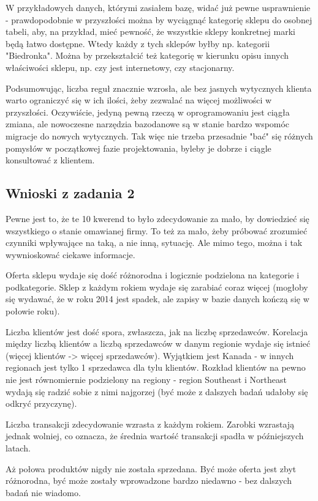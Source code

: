 \documentclass[a4paper,12pt]{article}
\begin{document}
W przykładowych danych, którymi zasiałem bazę, widać już pewne usprawnienie - prawdopodobnie w przyszłości można by wyciągnąć kategorię sklepu do osobnej tabeli, aby, na przykład, mieć pewność, że wszystkie sklepy konkretnej marki będą łatwo dostępne. Wtedy każdy z tych sklepów byłby np. kategorii "Biedronka". Można by przekształcić też kategorię w kierunku opisu innych właściwości sklepu, np. czy jest internetowy, czy stacjonarny.

Podsumowując, liczba reguł znacznie wzrosła, ale bez jasnych wytycznych klienta warto ograniczyć się w ich ilości, żeby zezwalać na więcej możliwości w przyszłości. Oczywiście, jedyną pewną rzeczą w oprogramowaniu jest ciągła zmiana, ale nowoczesne narzędzia bazodanowe są w stanie bardzo wspomóc migracje do nowych wytycznych.
Tak więc nie trzeba przesadnie "bać" się różnych pomysłów w początkowej fazie projektowania, byleby je dobrze i ciągle konsultować z klientem.

\subsection{Wnioski z zadania 2}

Pewne jest to, że te 10 kwerend to było zdecydowanie za mało, by dowiedzieć się wszystkiego o stanie omawianej firmy. To też za mało, żeby próbować zrozumieć czynniki wpływające na taką, a nie inną, sytuację. Ale mimo tego, można i tak wywnioskować ciekawe informacje.

Oferta sklepu wydaje się dość różnorodna i logicznie podzielona na kategorie i podkategorie. Sklep z każdym rokiem wydaje się zarabiać coraz więcej (mogłoby się wydawać, że w roku 2014 jest spadek, ale zapisy w bazie danych kończą się w połowie roku). 

Liczba klientów jest dość spora, zwłaszcza, jak na liczbę sprzedawców. Korelacja między liczbą klientów a liczbą sprzedawców w danym regionie wydaje się istnieć (więcej klientów -> więcej sprzedawców). Wyjątkiem jest Kanada - w innych regionach jest tylko 1 sprzedawca dla tylu klientów. Rozkład klientów na pewno nie jest równomiernie podzielony na regiony - region Southeast i Northeast wydają się radzić sobie z nimi najgorzej (być może z dalszych badań udałoby się odkryć przyczynę).

Liczba transakcji zdecydowanie wzrasta z każdym rokiem. Zarobki wzrastają jednak wolniej, co oznacza, że średnia wartość transakcji spadła w późniejszych latach.

Aż połowa produktów nigdy nie została sprzedana. Być może oferta jest zbyt różnorodna, być może zostały wprowadzone bardzo niedawno - bez dalszych badań nie wiadomo.
\end{document}
